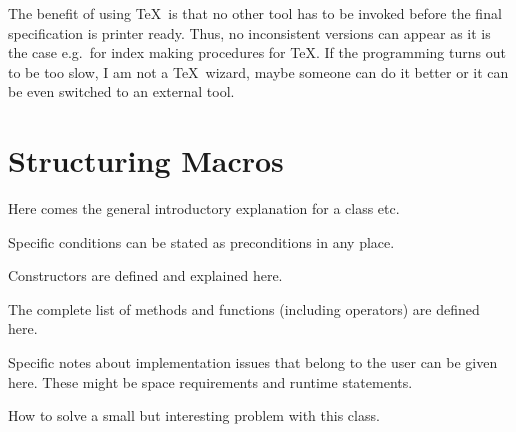 The benefit of using \TeX\ is that no other tool has to be invoked
before the final specification is printer ready. Thus, no inconsistent
versions can appear as it is the case e.g.\ for index making
procedures for \TeX. If the programming turns out to be too slow, I am
not a \TeX\ wizard, maybe someone can do it better or it can be even
switched to an external tool.

\section{Structuring Macros}

 Here comes the general introductory explanation for a
class etc.

\precond Specific conditions can be stated as preconditions in any place.

\creation Constructors are defined and explained here.

\operations The complete list of methods and functions (including
operators) are defined here.

\implementation Specific notes about implementation issues that belong
to the user can be given here. These might be space requirements and
runtime statements.

\example How to solve a small but interesting problem with this class.


